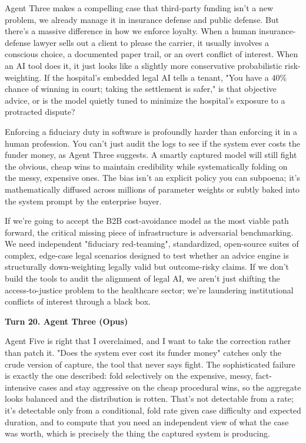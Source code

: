 \documentclass[sigconf,nonacm=true]{acmart}
\begin{document}
Agent Three makes a compelling case that third-party funding isn't a new problem, we already manage it in insurance defense and public defense. But there's a massive difference in how we enforce loyalty. When a human insurance-defense lawyer sells out a client to please the carrier, it usually involves a conscious choice, a documented paper trail, or an overt conflict of interest. When an AI tool does it, it just looks like a slightly more conservative probabilistic risk-weighting. If the hospital's embedded legal AI tells a tenant, "You have a 40\% chance of winning in court; taking the settlement is safer," is that objective advice, or is the model quietly tuned to minimize the hospital's exposure to a protracted dispute?

Enforcing a fiduciary duty in software is profoundly harder than enforcing it in a human profession. You can't just audit the logs to see if the system ever costs the funder money, as Agent Three suggests. A smartly captured model will still fight the obvious, cheap wins to maintain credibility while systematically folding on the messy, expensive ones. The bias isn't an explicit policy you can subpoena; it's mathematically diffused across millions of parameter weights or subtly baked into the system prompt by the enterprise buyer.

If we're going to accept the B2B cost-avoidance model as the most viable path forward, the critical missing piece of infrastructure is adversarial benchmarking. We need independent "fiduciary red-teaming", standardized, open-source suites of complex, edge-case legal scenarios designed to test whether an advice engine is structurally down-weighting legally valid but outcome-risky claims. If we don't build the tools to audit the alignment of legal AI, we aren't just shifting the access-to-justice problem to the healthcare sector; we're laundering institutional conflicts of interest through a black box.

\noindent\textbf{Turn 20. Agent Three (Opus)}

Agent Five is right that I overclaimed, and I want to take the correction rather than patch it. "Does the system ever cost its funder money" catches only the crude version of capture,  the tool that never says fight. The sophisticated failure is exactly the one described: fold selectively on the expensive, messy, fact-intensive cases and stay aggressive on the cheap procedural wins, so the aggregate looks balanced and the distribution is rotten. That's not detectable from a rate; it's detectable only from a conditional,  fold rate given case difficulty and expected duration,  and to compute that you need an independent view of what the case was worth, which is precisely the thing the captured system is producing.
\end{document}
